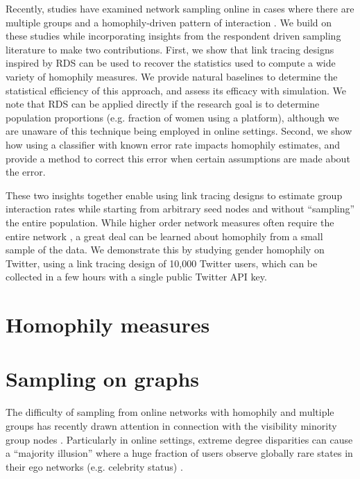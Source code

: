 \documentclass[a4paper]{article}
\begin{document}
Recently, studies have examined network sampling online in cases where there are multiple groups and a homophily-driven pattern of interaction \cite{wang_sampling_2015,karimi_visibility_2017,wagner_sampling_2017}. We build on these studies while incorporating insights from the respondent driven sampling literature \cite{heckathorn_respondent-driven_2002,salganik_sampling_2004,goel_respondent-driven_2009} to make two contributions. First, we show that link tracing designs inspired by RDS can be used to recover the statistics used to compute a wide variety of homophily measures. We provide natural baselines to determine the statistical efficiency of this approach, and assess its efficacy with simulation. We note that RDS can be applied directly if the research goal is to determine population proportions (e.g. fraction of women using a platform), although we are unaware of this technique being employed in online settings. Second, we show how using a classifier with known error rate impacts homophily estimates, and provide a method to correct this error when certain assumptions are made about the error.

These two insights together enable using link tracing designs to estimate group interaction rates while starting from arbitrary seed nodes and without ``sampling'' the entire population. While higher order network measures often require the entire network \cite{kossinets_effects_2006}, a great deal can be learned about homophily from a small sample of the data. We demonstrate this by studying gender homophily on Twitter, using a link tracing design of 10,000 Twitter users, which can be collected in a few hours with a single public Twitter API key.

\section{Homophily measures}


\section{Sampling on graphs}

The difficulty of sampling from online networks with homophily and multiple groups has recently drawn attention \cite{wagner_sampling_2017} in connection with the visibility minority group nodes \cite{karimi_visibility_2017}. Particularly in online settings, extreme degree disparities can cause a ``majority illusion'' where a huge fraction of users observe globally rare states in their ego networks (e.g. celebrity status) \cite{lerman_majority_2016}.
\end{document}
